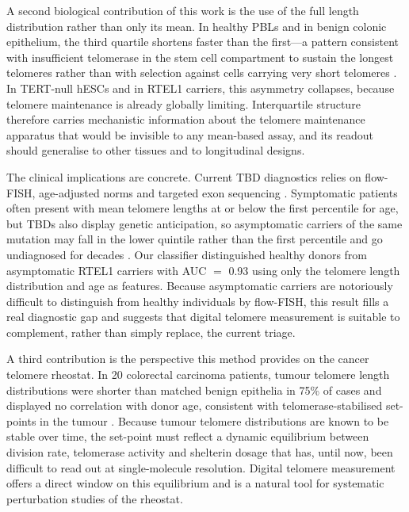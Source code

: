 \documentclass[11pt]{article}
\begin{document}
A second biological contribution of this work is the use of the full
length distribution rather than only its mean. In healthy PBLs and in
benign colonic epithelium, the third quartile shortens faster than the
first---a pattern consistent with insufficient telomerase in the stem
cell compartment to sustain the longest telomeres rather than with
selection against cells carrying very short telomeres
\citep{britt2012preferential}. In TERT-null hESCs and in RTEL1 carriers,
this asymmetry collapses, because telomere maintenance is already
globally limiting. Interquartile structure therefore carries
mechanistic information about the telomere maintenance apparatus that
would be invisible to any mean-based assay, and its readout should
generalise to other tissues and to longitudinal designs.

The clinical implications are concrete. Current TBD diagnostics relies
on flow-FISH, age-adjusted norms and targeted exon sequencing
\citep{alder2018diagnostic,armanios2012telomeres}. Symptomatic patients
often present with mean telomere lengths at or below the first
percentile for age, but TBDs also display genetic anticipation, so
asymptomatic carriers of the same mutation may fall in the lower
quintile rather than the first percentile and go undiagnosed for
decades \citep{walne2013constitutional,savage2008tinf2}. Our classifier
distinguished healthy donors from asymptomatic RTEL1 carriers with
AUC $=$ 0.93 using only the telomere length distribution and age as
features. Because asymptomatic carriers are notoriously difficult to
distinguish from healthy individuals by flow-FISH, this result fills a
real diagnostic gap and suggests that digital telomere measurement is
suitable to complement, rather than simply replace, the current triage.

A third contribution is the perspective this method provides on the
cancer telomere rheostat. In 20 colorectal carcinoma patients, tumour
telomere length distributions were shorter than matched benign
epithelia in 75\% of cases and displayed no correlation with donor age,
consistent with telomerase-stabilised set-points in the tumour
\citep{chiba2015cancer,barthel2017systematic,roka2023tumor}. Because
tumour telomere distributions are known to be stable over time, the
set-point must reflect a dynamic equilibrium between division rate,
telomerase activity and shelterin dosage that has, until now, been
difficult to read out at single-molecule resolution. Digital telomere
measurement offers a direct window on this equilibrium and is a natural
tool for systematic perturbation studies of the rheostat.
\end{document}
